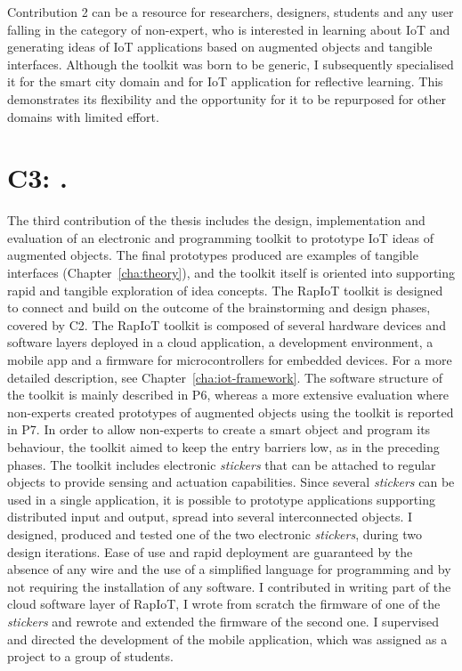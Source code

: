 Contribution 2 can be a resource for researchers, designers, students and any user falling in the category of non-expert, who is interested in learning about IoT and generating ideas of IoT applications based on augmented objects and tangible interfaces. Although the toolkit was born to be generic, I subsequently specialised it for the smart city domain and for IoT application for reflective learning. This demonstrates its flexibility and the opportunity for it to be repurposed for other domains with limited effort.


\section[C3: \Ciii][Contribution 3]{C3: \Ciii.}
\label{c3}

The third contribution of the thesis includes the design, implementation and evaluation of an electronic and programming toolkit to prototype IoT ideas of augmented objects. The final prototypes produced are examples of tangible interfaces (Chapter~\ref{cha:theory}), and the toolkit itself is oriented into supporting rapid and tangible exploration of idea concepts. The RapIoT toolkit is designed to connect and build on the outcome of the brainstorming and design phases, covered by C2.
The RapIoT toolkit is composed of several hardware devices and software layers deployed in a cloud application, a development environment, a mobile app and a firmware for microcontrollers for embedded devices. For a more detailed description, see Chapter~\ref{cha:iot-framework}. The software structure of the toolkit is mainly described in P6, whereas a more extensive evaluation where non-experts created prototypes of augmented objects using the toolkit is reported in P7.
In order to allow non-experts to create a smart object and program its behaviour, the toolkit aimed to keep the entry barriers low, as in the preceding phases.
The toolkit includes electronic \textit{stickers} that can be attached to regular objects to provide sensing and actuation capabilities. Since several \textit{stickers} can be used in a single application, it is possible to prototype applications supporting distributed input and output, spread into several interconnected objects. I designed, produced and tested one of the two electronic \textit{stickers}, during two design iterations.
Ease of use and rapid deployment are guaranteed by the absence of any wire and the use of a simplified language for programming and by not requiring the installation of any software.
I contributed in writing part of the cloud software layer of RapIoT, I wrote from scratch the firmware of one of the \textit{stickers} and rewrote and extended the firmware of the second one. I supervised and directed the development of the mobile application, which was assigned as a project to a group of students.

